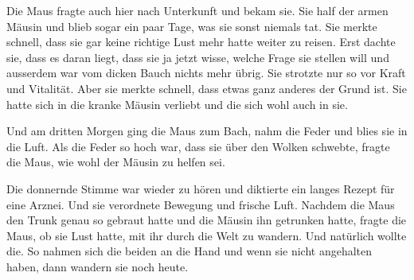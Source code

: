Die Maus fragte auch hier nach Unterkunft und bekam sie. Sie half der armen
Mäusin und blieb sogar ein paar Tage, was sie sonst niemals tat. Sie merkte
schnell, dass sie gar keine richtige Lust mehr hatte weiter zu reisen. Erst
dachte sie, dass es daran liegt, dass sie ja jetzt wisse, welche Frage sie
stellen will und ausserdem war vom dicken Bauch nichts mehr übrig. Sie strotzte
nur so vor Kraft und Vitalität. Aber sie merkte schnell, dass etwas ganz
anderes der Grund ist. Sie hatte sich in die kranke Mäusin verliebt und die
sich wohl auch in sie.

Und am dritten Morgen ging die Maus zum Bach, nahm die Feder und blies sie in die Luft. Als die Feder so hoch war, dass sie über den Wolken schwebte, fragte die Maus, wie wohl der Mäusin zu helfen sei.

Die donnernde Stimme war wieder zu hören und diktierte ein langes Rezept für eine Arznei. Und sie verordnete Bewegung und frische Luft. Nachdem die Maus den Trunk genau so gebraut hatte und die Mäusin ihn getrunken hatte, fragte die Maus, ob sie Lust hatte, mit ihr durch die Welt zu wandern. Und natürlich wollte die. So nahmen sich die beiden an die Hand und wenn sie nicht angehalten haben, dann wandern sie noch heute. \hfill {\color{DeepPink}\decofourleft}
